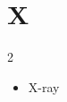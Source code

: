 \documentclass[../../book.tex]{subfiles}
\begin{document}
\section{X}
\raggedcolumns
\begin{multicols}{2}
\begin{itemize}
\item[-] X-ray
\end{itemize}
\end{multicols}
\end{document}
